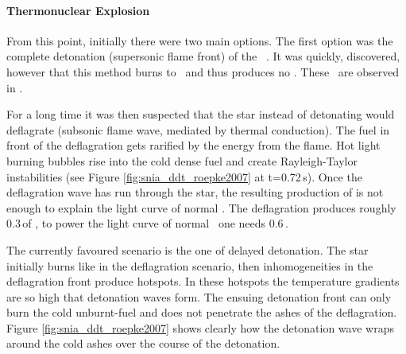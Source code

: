 \paragraph{Thermonuclear Explosion}
From this point, initially there were two main options. The first option was the complete detonation (supersonic flame front) of the \cowd\ \citep{1969Ap&SS...5..180A}. It was quickly, discovered, however that this method burns to \nse\ and thus produces no \ime. These \ime\ are observed in \snia.

For a long time it was then suspected that the star instead of detonating would deflagrate (subsonic flame wave, mediated by thermal conduction). The fuel in front of the deflagration gets rarified by the energy from the flame. Hot light burning bubbles rise into the cold dense fuel and create Rayleigh-Taylor instabilities (see Figure \ref{fig:snia_ddt_roepke2007} at t=0.72\,s). 
Once the deflagration wave has run through the star, the resulting production of \Ni[56] is not enough to explain the light curve of normal \snia. The deflagration produces roughly 0.3\,\msun of \Ni[56], to power the light curve of normal \sneia\ one needs 0.6\,\msun \citep{2007Sci...315..825M}.

The currently favoured scenario is the one of delayed detonation. The star initially burns like in the deflagration scenario, then inhomogeneities in the deflagration front produce hotspots. In these hotspots the temperature gradients are so high that detonation waves form. The ensuing detonation front can only burn the cold unburnt-fuel and does not penetrate the ashes of the deflagration. Figure \ref{fig:snia_ddt_roepke2007} shows clearly how the detonation wave wraps around the cold ashes over the course of the detonation.


